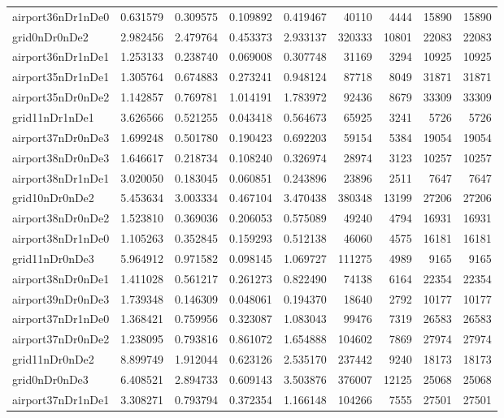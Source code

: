\documentclass[../../../thesis.tex]{subfiles}
\begin{document}
\begin{longtable}{|l|r|r|r|r|r|r|r|r|}
airport36nDr1nDe0 & 0.631579 & 0.309575 & 0.109892 & 0.419467 & 40110 & 4444 & 15890 & 15890 \\
grid0nDr0nDe2 & 2.982456 & 2.479764 & 0.453373 & 2.933137 & 320333 & 10801 & 22083 & 22083 \\
airport36nDr1nDe1 & 1.253133 & 0.238740 & 0.069008 & 0.307748 & 31169 & 3294 & 10925 & 10925 \\
airport35nDr1nDe1 & 1.305764 & 0.674883 & 0.273241 & 0.948124 & 87718 & 8049 & 31871 & 31871 \\
airport35nDr0nDe2 & 1.142857 & 0.769781 & 1.014191 & 1.783972 & 92436 & 8679 & 33309 & 33309 \\
grid11nDr1nDe1 & 3.626566 & 0.521255 & 0.043418 & 0.564673 & 65925 & 3241 & 5726 & 5726 \\
airport37nDr0nDe3 & 1.699248 & 0.501780 & 0.190423 & 0.692203 & 59154 & 5384 & 19054 & 19054 \\
airport38nDr0nDe3 & 1.646617 & 0.218734 & 0.108240 & 0.326974 & 28974 & 3123 & 10257 & 10257 \\
airport38nDr1nDe1 & 3.020050 & 0.183045 & 0.060851 & 0.243896 & 23896 & 2511 & 7647 & 7647 \\
grid10nDr0nDe2 & 5.453634 & 3.003334 & 0.467104 & 3.470438 & 380348 & 13199 & 27206 & 27206 \\
airport38nDr0nDe2 & 1.523810 & 0.369036 & 0.206053 & 0.575089 & 49240 & 4794 & 16931 & 16931 \\
airport38nDr1nDe0 & 1.105263 & 0.352845 & 0.159293 & 0.512138 & 46060 & 4575 & 16181 & 16181 \\
grid11nDr0nDe3 & 5.964912 & 0.971582 & 0.098145 & 1.069727 & 111275 & 4989 & 9165 & 9165 \\
airport38nDr0nDe1 & 1.411028 & 0.561217 & 0.261273 & 0.822490 & 74138 & 6164 & 22354 & 22354 \\
airport39nDr0nDe3 & 1.739348 & 0.146309 & 0.048061 & 0.194370 & 18640 & 2792 & 10177 & 10177 \\
airport37nDr1nDe0 & 1.368421 & 0.759956 & 0.323087 & 1.083043 & 99476 & 7319 & 26583 & 26583 \\
airport37nDr0nDe2 & 1.238095 & 0.793816 & 0.861072 & 1.654888 & 104602 & 7869 & 27974 & 27974 \\
grid11nDr0nDe2 & 8.899749 & 1.912044 & 0.623126 & 2.535170 & 237442 & 9240 & 18173 & 18173 \\
grid0nDr0nDe3 & 6.408521 & 2.894733 & 0.609143 & 3.503876 & 376007 & 12125 & 25068 & 25068 \\
airport37nDr1nDe1 & 3.308271 & 0.793794 & 0.372354 & 1.166148 & 104266 & 7555 & 27501 & 27501 \\

\end{longtable}
\end{document}
